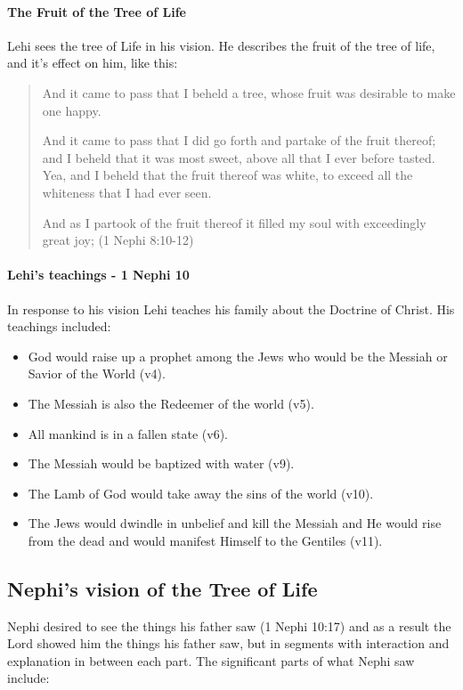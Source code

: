 \paragraph{The Fruit of the Tree of Life}
Lehi sees the tree of Life in his vision. He describes the fruit of the tree of life, and it's effect on him, like this:

\begin{quotation}
And it came to pass that I beheld a tree, whose fruit was desirable to make one happy.

And it came to pass that I did go forth and partake of the fruit thereof; and I beheld that it was most sweet, above all that I ever before tasted. Yea, and I beheld that the fruit thereof was white, to exceed all the whiteness that I had ever seen.

And as I partook of the fruit thereof it filled my soul with exceedingly great joy; (1 Nephi 8:10-12)
\end{quotation}

\paragraph{Lehi's teachings - 1 Nephi 10}
In response to his vision Lehi teaches his family about the Doctrine of Christ. His teachings included:

\begin{itemize}
  \item{God would raise up a prophet among the Jews who would be the Messiah or Savior of the World (v4).}
  \item{The Messiah is also the Redeemer of the world (v5).}
  \item{All mankind is in a fallen state (v6).}
  \item{The Messiah would be baptized with water (v9).}
  \item{The Lamb of God would take away the sins of the world (v10).}
  \item{The Jews would dwindle in unbelief and kill the Messiah and He would rise from the dead and would manifest Himself to the Gentiles (v11).}
\end{itemize}

\subsection{Nephi's vision of the Tree of Life}

Nephi desired to see the things his father saw (1 Nephi 10:17) and as a result the Lord showed him the things his father saw, but in segments with interaction and explanation in between each part. The significant parts of what Nephi saw include:


